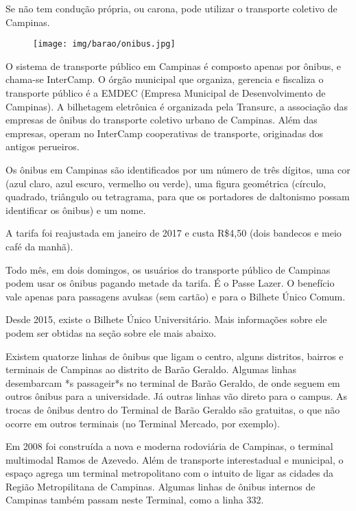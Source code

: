 Se não tem condução própria, ou carona, pode utilizar o transporte coletivo de
Campinas.

\begin{figure}[h!]  \centering
    \texttt{[image: img/barao/onibus.jpg]}
\end{figure}

O sistema de transporte público em Campinas é composto apenas por ônibus, e
chama-se InterCamp. O órgão municipal que organiza, gerencia e fiscaliza o
transporte público é a EMDEC (Empresa Municipal de Desenvolvimento de
Campinas). A bilhetagem eletrônica é organizada pela Transurc, a associação das
empresas de ônibus do transporte coletivo urbano de Campinas. Além das
empresas, operam no InterCamp cooperativas de transporte, originadas dos
antigos perueiros.

Os ônibus em Campinas são identificados por um número de três dígitos, uma cor
(azul claro, azul escuro, vermelho ou verde), uma figura geométrica (círculo,
quadrado, triângulo ou tetragrama, para que os portadores de daltonismo possam
identificar os ônibus) e um nome.

A tarifa foi reajustada em janeiro de 2017 e custa R\$4,50 (dois bandecos e
meio café da manhã).

Todo mês, em dois domingos, os usuários do transporte público de Campinas podem
usar os ônibus pagando metade da tarifa. É o Passe Lazer. O benefício vale
apenas para passagens avulsas (sem cartão) e para o Bilhete Único Comum.

Desde 2015, existe o Bilhete Único Universitário. Mais informações sobre ele
podem ser obtidas na seção sobre ele mais abaixo.

Existem quatorze linhas de ônibus que ligam o centro, alguns distritos, bairros
e terminais de Campinas ao distrito de Barão Geraldo. Algumas linhas
desembarcam *s passageir*s no terminal de Barão Geraldo, de onde seguem em
outros ônibus para a universidade. Já outras linhas vão direto para o campus.
As trocas de ônibus dentro do Terminal de Barão Geraldo são gratuitas, o que
não ocorre em outros terminais (no Terminal Mercado, por exemplo).

Em 2008 foi construída a nova e moderna rodoviária de Campinas, o terminal
multimodal Ramos de Azevedo. Além de transporte interestadual e municipal, o
espaço agrega um terminal metropolitano com o intuito de ligar as cidades da
Região Metropilitana de Campinas. Algumas linhas de ônibus internos de Campinas
também passam neste Terminal, como a linha 332.

